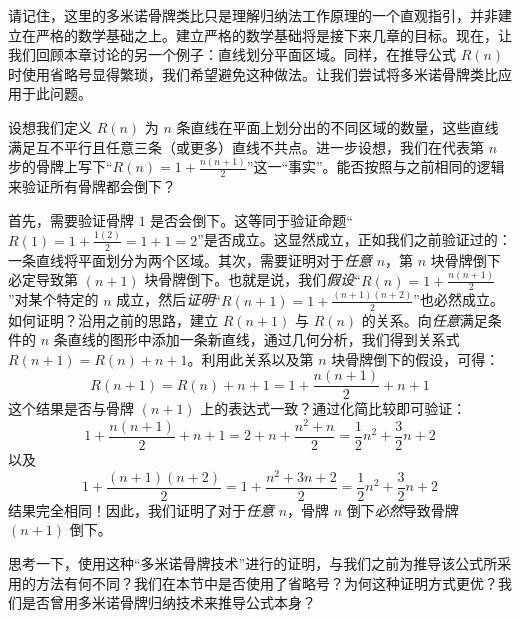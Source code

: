 请记住，这里的多米诺骨牌类比只是理解归纳法工作原理的一个直观指引，并非建立在严格的数学基础之上。建立严格的数学基础将是接下来几章的目标。现在，让我们回顾本章讨论的另一个例子：直线划分平面区域。同样，在推导公式 $R(n)$ 时使用省略号显得繁琐，我们希望避免这种做法。让我们尝试将多米诺骨牌类比应用于此问题。

设想我们定义 $R(n)$ 为 $n$ 条直线在平面上划分出的不同区域的数量，这些直线满足互不平行且任意三条（或更多）直线不共点。进一步设想，我们在代表第 $n$ 步的骨牌上写下``$R(n) = 1 + \frac{n(n+1)}{2}$''这一``事实''。能否按照与之前相同的逻辑来验证所有骨牌都会倒下？

首先，需要验证骨牌 $1$ 是否会倒下。这等同于验证命题``$R(1) = 1+\frac{1(2)}{2} = 1+1 = 2$''是否成立。这显然成立，正如我们之前验证过的：一条直线将平面划分为两个区域。其次，需要证明对于\emph{任意} $n$，第 $n$ 块骨牌倒下必定导致第 $(n + 1)$ 块骨牌倒下。也就是说，我们\emph{假设}``$R(n) = 1 + \frac{n(n+1)}{2}$''对某个特定的 $n$ 成立，然后\emph{证明}``$R(n + 1) = 1 + \frac{(n+1)(n +2)}{2}$''也必然成立。如何证明？沿用之前的思路，建立 $R(n + 1)$ 与 $R(n)$ 的关系。向\emph{任意}满足条件的 $n$ 条直线的图形中添加一条新直线，通过几何分析，我们得到关系式 $R(n+1) = R(n) + n + 1$。利用此关系以及第 $n$ 块骨牌倒下的假设，可得：
\[R(n + 1) = R(n) + n + 1 = 1 +\frac{n(n+1)}{2}+ n + 1\]
这个结果是否与骨牌 $(n + 1)$ 上的表达式一致？通过化简比较即可验证：
\[1 +\frac{n(n+1)}{2}+ n + 1=2+n+\frac{n^2+n}{2} = \frac{1}{2}n^2+\frac{3}{2}n+2\]
以及
\[1 + \frac{(n+1)(n +2)}{2} = 1+\frac{n^2+3n+2}{2} =  \frac{1}{2}n^2+\frac{3}{2}n+2\]
结果完全相同！因此，我们证明了对于\emph{任意} $n$，骨牌 $n$ 倒下\emph{必然}导致骨牌 $(n+1)$ 倒下。

思考一下，使用这种``多米诺骨牌技术''进行的证明，与我们之前为推导该公式所采用的方法有何不同？我们在本节中是否使用了省略号？为何这种证明方式更优？我们是否曾用多米诺骨牌归纳技术来推导公式本身？
